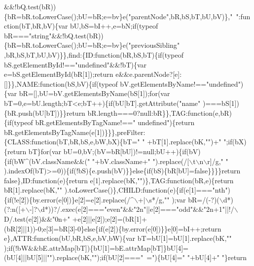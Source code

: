 \begin{DoxyCode}
{      &&!bQ.test(bR))\{bR=bR.toLowerCase();bU=bR;e=bv\}e("}parentNode\textcolor{stringliteral}{",bR,bS,bT,bU,bV)\},"}~\textcolor{stringliteral}{":function(bT,bR,bV)\{var
       bU,bS=bI++,e=bN;if(typeof bR==="}\textcolor{keywordtype}{string}\textcolor{stringliteral}{"&&!bQ.test(bR))\{bR=bR.toLowerCase();bU=bR;e=bv\}e("}previousSibling\textcolor{stringliteral}{"
      ,bR,bS,bT,bU,bV)\}\},find:\{ID:function(bR,bS,bT)\{if(typeof bS.getElementById!=="}undefined\textcolor{stringliteral}{"&&!bT)\{var
       e=bS.getElementById(bR[1]);return e&&e.parentNode?[e]:[]\}\},NAME:function(bS,bV)\{if(typeof bV.getElementsByName!=="}undefined\textcolor{stringliteral}{")\{var
       bR=[],bU=bV.getElementsByName(bS[1]);for(var bT=0,e=bU.length;bT<e;bT++)\{if(bU[bT].getAttribute("}name\textcolor{stringliteral}{"
      )===bS[1])\{bR.push(bU[bT])\}\}return bR.length===0?null:bR\}\},TAG:function(e,bR)\{if(typeof bR.getElementsByTagName!=="}
      undefined\textcolor{stringliteral}{")\{return bR.getElementsByTagName(e[1])\}\}\},preFilter:\{CLASS:function(bT,bR,bS,e,bW,bX)\{bT="} \textcolor{stringliteral}{"
      +bT[1].replace(bK,"}\textcolor{stringliteral}{")+"} \textcolor{stringliteral}{";if(bX)\{return bT\}for(var bU=0,bV;(bV=bR[bU])!=null;bU++)\{if(bV)\{if(bW^(bV.className&&("} \textcolor{stringliteral}{
      "+bV.className+"} \textcolor{stringliteral}{").replace(/[\(\backslash\)t\(\backslash\)n\(\backslash\)r]/g,"} \textcolor{stringliteral}{"
      ).indexOf(bT)>=0))\{if(!bS)\{e.push(bV)\}\}else\{if(bS)\{bR[bU]=false\}\}\}\}return false\},ID:function(e)\{return e[1].replace(bK,"}\textcolor{stringliteral}{")\},TAG:function(bR,e)\{return bR[1].replace(bK,"}\textcolor{stringliteral}{"
      ).toLowerCase()\},CHILD:function(e)\{if(e[1]==="}nth\textcolor{stringliteral}{")\{if(!e[2])\{by.error(e[0])\}e[2]=e[2].replace(/^\(\backslash\)+|\(\backslash\)s*/g,"}\textcolor{stringliteral}{"
      );var bR=/(-?)(\(\backslash\)d*)(?:n([+\(\backslash\)-]?\(\backslash\)d*))?/.exec(e[2]==="}even\textcolor{stringliteral}{"&&"}2n\textcolor{stringliteral}{"||e[2]==="}odd\textcolor{stringliteral}{"&&"}2n+1\textcolor{stringliteral}{"||!/\(\backslash\)D/.test(e[2])&&"}0n+\textcolor{stringliteral}{"
      +e[2]||e[2]);e[2]=(bR[1]+(bR[2]||1))-0;e[3]=bR[3]-0\}else\{if(e[2])\{by.error(e[0])\}\}e[0]=bI++;return
       e\},ATTR:function(bU,bR,bS,e,bV,bW)\{var bT=bU[1]=bU[1].replace(bK,"}\textcolor{stringliteral}{"
      );if(!bW&&bE.attrMap[bT])\{bU[1]=bE.attrMap[bT]\}bU[4]=(bU[4]||bU[5]||"}\textcolor{stringliteral}{").replace(bK,"}\textcolor{stringliteral}{");if(bU[2]==="}~=\textcolor{stringliteral}{")\{bU[4]="} \textcolor{stringliteral}{"+bU[4]+"} \textcolor{stringliteral}{"\}return
}
\end{DoxyCode}
